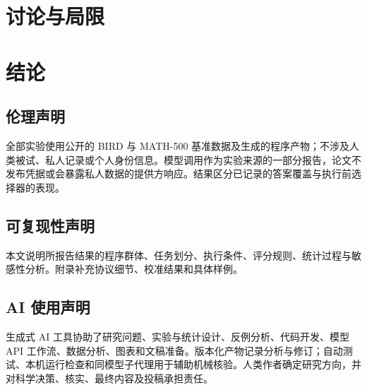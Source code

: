 \documentclass{article}
\begin{document}
\section{讨论与局限}\label{sec:discussion}


\section{结论}\label{sec:conclusion}
\label{endofmain}

\subsection*{伦理声明}
全部实验使用公开的 BIRD 与 MATH-500 基准数据及生成的程序产物；不涉及人类被试、私人记录或个人身份信息。模型调用作为实验来源的一部分报告，论文不发布凭据或会暴露私人数据的提供方响应。结果区分已记录的答案覆盖与执行前选择器的表现。

\subsection*{可复现性声明}
本文说明所报告结果的程序群体、任务划分、执行条件、评分规则、统计过程与敏感性分析。附录补充协议细节、校准结果和具体样例。

\subsection*{AI 使用声明}
生成式 AI 工具协助了研究问题、实验与统计设计、反例分析、代码开发、模型 API 工作流、数据分析、图表和文稿准备。版本化产物记录分析与修订；自动测试、本机运行检查和同模型子代理用于辅助机械核验。人类作者确定研究方向，并对科学决策、核实、最终内容及投稿承担责任。




\appendix
\raggedbottom

\end{document}
